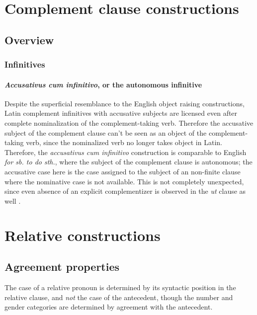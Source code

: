 \documentclass[a4paper, oneside, 12pt]{report}
\newcommand*{\citepages}[1]{pp.~{#1}}
\newcommand{\form}[1]{\emph{#1}}
\begin{document}
\chapter{Complement clause constructions}\label{chap:complement-clause-construct}

\section{Overview}\label{sec:complement-clause-construct-overview}

\subsection{Infinitives}

\subsubsection{\form{Accusativus cum infinitivo}, or the autonomous infinitive}

Despite the superficial resemblance to the English object raising constructions,
Latin complement infinitives with accusative subjects 
are licensed even after complete nominalization
of the complement-taking verb.
Therefore the accusative subject of the complement clause 
can't be seen as an object of the complement-taking verb, 
since the nominalized verb no longer takes object in Latin.
Therefore, the \form{accusativus cum infinitivo} construction 
is comparable to English \form{for sb. to do sth.},
where the subject of the complement clause is autonomous;
the accusative case here is the case assigned to 
the subject of an non-finite clause where the nominative case is not available.
This is not completely unexpected, 
since even absence of an explicit complementizer 
is observed in the \form{ut} clause as well
\citep[\citepages{290-292}]{oniga2014latin}.

\chapter{Relative constructions}\label{chap:relative-clause}

\section{Agreement properties}\label{sec:relative-clause.overview.agreement}

The case of a relative pronoun is determined 
by its syntactic position in the relative clause, 
and \emph{not} the case of the antecedent,
though the number and gender categories 
are determined by agreement with the antecedent.
\end{document}
